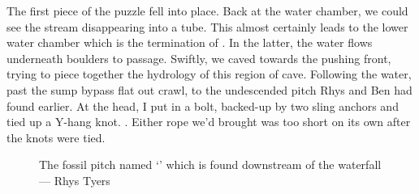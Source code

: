	The first piece of the puzzle fell into place. Back at the water chamber, we could see the stream disappearing into a tube. This almost certainly leads to the lower water chamber which is the termination of . In the latter, the water flows underneath boulders to  passage. Swiftly, we caved towards the pushing front, trying to piece together the hydrology of this region of cave. Following the water, past the sump bypass flat out crawl, to the undescended pitch Rhys and Ben had found earlier. At the head, I put in a bolt, backed-up by two sling anchors and tied up a Y-hang knot. . Either rope we'd brought was too short on its own after the knots were tied.

    \begin{figure}[h]
        \checkoddpage \ifoddpage \forcerectofloat \else \forceversofloat \fi
        \centering
        
        \caption{The fossil pitch named `\protect{}' which is found downstream of the \protect{} waterfall --- Rhys Tyers}
        \label{water chamber below helm's deep}
    \end{figure}

